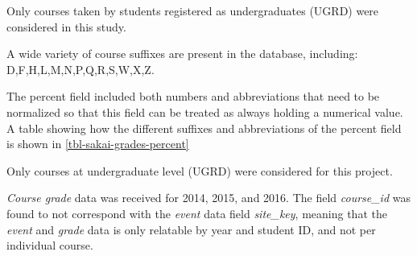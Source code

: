 \item[\textsuperscript{3}]Only courses taken by students registered as undergraduates (UGRD) were considered in this study.
\item[\textsuperscript{4}]A wide variety of course suffixes are present in the database, including: D,F,H,L,M,N,P,Q,R,S,W,X,Z.
\item[\textsuperscript{5}]The percent field included both numbers and abbreviations that need to be normalized so that this field can be treated as always holding a numerical value. A table showing how the different suffixes and abbreviations of the percent field is shown in \ref{tbl-sakai-grades-percent}
\item[\textsuperscript{6}]Only courses at undergraduate level (UGRD) were considered for this project.





\textit{Course grade} data was received for 2014, 2015, and 2016. The field \textit{course\_id} was found to not correspond with the \textit{event} data field \textit{site\_key}, meaning that the \textit{event} and \textit{grade} data is only relatable by year and student ID, and not per individual course.







